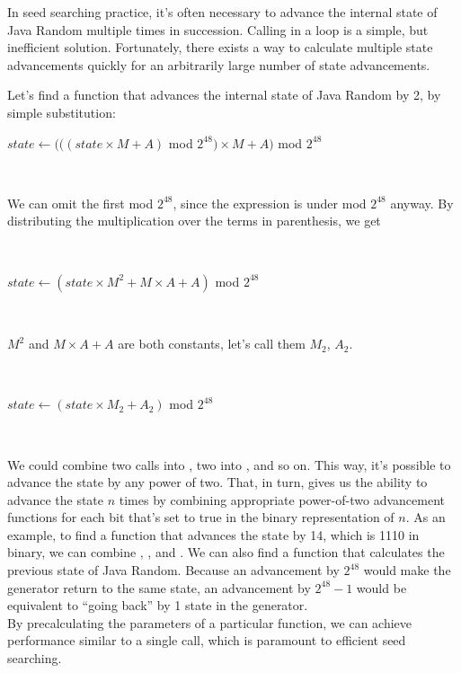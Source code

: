 \documentclass{article}
\begin{document}
In seed searching practice, it’s often necessary to advance the internal state of Java Random multiple times in succession. Calling  in a loop is a simple, but inefficient solution. Fortunately, there exists a way to calculate multiple state advancements quickly for an arbitrarily large number of state advancements.

Let’s find a function that advances the internal state of Java Random by 2, by simple substitution:

\begin{algorithmic}
    \State $state \gets (((state \times M + A)$ mod $2^{48}) \times M + A)$ mod $2^{48}$
\EndFunction
\end{algorithmic}
\ \

\noindent We can omit the first mod $2^{48}$, since the expression is under mod $2^{48}$ anyway. By distributing the multiplication over the terms in parenthesis, we get

\
\begin{algorithmic}
    \State $state \gets (state \times M^2 + M \times A + A)$ mod $2^{48}$
\EndFunction
\end{algorithmic}
\ \

\noindent $M^2$ and $M \times A + A$ are both constants, let’s call them $M_2$, $A_2$.

\
\begin{algorithmic}
\Function{advanceBy2}{} 
    \State $state \gets (state \times M_2 + A_2)$ mod $2^{48}$
\EndFunction
\end{algorithmic}
\ \

We could combine two  calls into , two  into , and so on. This way, it’s possible to advance the state by any power of two. That, in turn, gives us the ability to advance the state $n$ times by combining appropriate power-of-two advancement functions for each bit that’s set to true in the binary representation of $n$.
As an example, to find a function that advances the state by 14, which is 1110 in binary, we can combine , , and . 
We can also find a function that calculates the previous state of Java Random. Because an advancement by $2^{48}$ would make the generator return to the same state, an advancement by $2^{48}-1$ would be equivalent to “going back” by 1 state in the generator. \\
By precalculating the parameters of a particular \Call{advanceByN}{} function, we can achieve performance similar to a single \Call{nextSeed}{} call, which is paramount to efficient seed searching.
\end{document}
